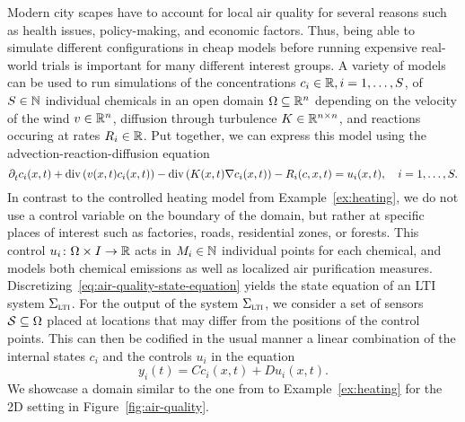\begin{example}
    Modern city scapes have to account for local air quality for several reasons such as health issues, policy-making, and economic factors.
    Thus, being able to simulate different configurations in cheap models before running expensive real-world trials is important for many different interest groups.
    A variety of models can be used to run simulations of the concentrations $c_i \in \bb{R}, i = 1, \dots, S$, of $S \in \bb{N}$ individual chemicals in an open domain $\Omega \subseteq \bb{R}^n$ depending on the velocity of the wind $v \in \bb{R}^n$, diffusion through turbulence $K \in \bb{R}^{n \times n}$, and reactions occuring at rates $R_i \in \bb{R}$.
    Put together, we can express this model using the advection-reaction-diffusion equation
    \begin{equation}\label{eq:air-quality-state-equation}
        \pd[t]{} c_i(x, t) + \dvg \left( v(x, t) c_i(x, t) \right) - \dvg \left( K(x, t) \nabla c_i(x, t) \right) - R_i(c, x, t) = u_i(x, t),\quad i = 1, \dots, S.
    \end{equation}
    In contrast to the controlled heating model from Example~\ref{ex:heating}, we do not use a control variable on the boundary of the domain, but rather at specific places of interest such as factories, roads, residential zones, or forests.
    This control $u_i \colon \Omega \times I \to \bb{R}$ acts in $M_i \in \bb{N}$ individual points for each chemical, and models both chemical emissions as well as localized air purification measures.
    Discretizing~\eqref{eq:air-quality-state-equation} yields the state equation of an \ac{LTI} system $\Sigma_{\msc{lti}}$.
    For the output of the system $\Sigma_{\msc{lti}}$, we consider a set of sensors $\mcl{S} \subseteq \Omega$ placed at locations that may differ from the positions of the control points.
    This can then be codified in the usual manner a linear combination of the internal states $c_i$ and the controls $u_i$ in the equation
    \begin{equation*}
        y_i(t) = C c_i(x, t) + D u_i(x, t).
    \end{equation*}
    We showcase a domain similar to the one from to Example~\ref{ex:heating} for the 2D setting in Figure~\ref{fig:air-quality}.

    \begin{figure}[h]
        \centering
\end{figure}
\end{example}
